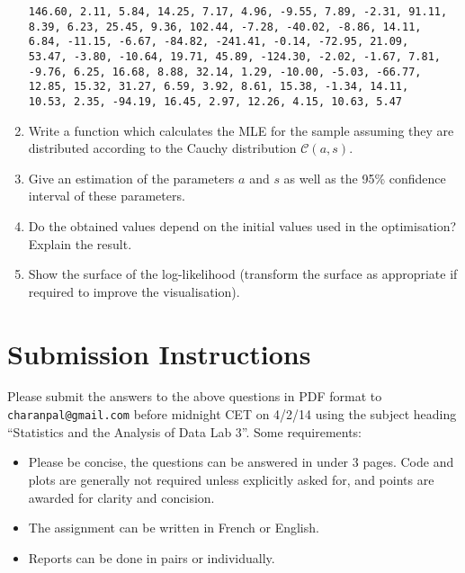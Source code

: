 \documentclass[a4paper,10pt]{article}
\begin{document}
\begin{enumerate}
\begin{lstlisting}
146.60, 2.11, 5.84, 14.25, 7.17, 4.96, -9.55, 7.89, -2.31, 91.11,
8.39, 6.23, 25.45, 9.36, 102.44, -7.28, -40.02, -8.86, 14.11, 
6.84, -11.15, -6.67, -84.82, -241.41, -0.14, -72.95, 21.09, 
53.47, -3.80, -10.64, 19.71, 45.89, -124.30, -2.02, -1.67, 7.81, 
-9.76, 6.25, 16.68, 8.88, 32.14, 1.29, -10.00, -5.03, -66.77, 
12.85, 15.32, 31.27, 6.59, 3.92, 8.61, 15.38, -1.34, 14.11, 
10.53, 2.35, -94.19, 16.45, 2.97, 12.26, 4.15, 10.63, 5.47
\end{lstlisting}
\item Write a function which calculates the MLE for the sample assuming they are distributed according to the Cauchy distribution $\mathcal{C}(a, s)$. 
\item Give an estimation of the parameters $a$ and $s$ as well as the 95\% confidence interval of these parameters. 
\item Do the obtained values depend on the initial values used in the optimisation? Explain the result. 
\item Show the surface of the log-likelihood (transform the surface as appropriate if required to improve the visualisation). 
\end{enumerate}


\section{Submission Instructions}

Please submit the answers to the above questions in PDF format to \texttt{charanpal@gmail.com} before midnight CET on 4/2/14 using the subject heading ``Statistics and the Analysis of Data Lab 3''. Some requirements: 
\begin{itemize} 
 \item Please be concise, the questions can be answered in under 3 pages. Code and plots are generally not required unless explicitly asked for, and points are awarded for clarity and concision. 
 \item The assignment can be written in French or English. 
 \item Reports can be done in pairs or individually.    
\end{itemize}
\end{document}
